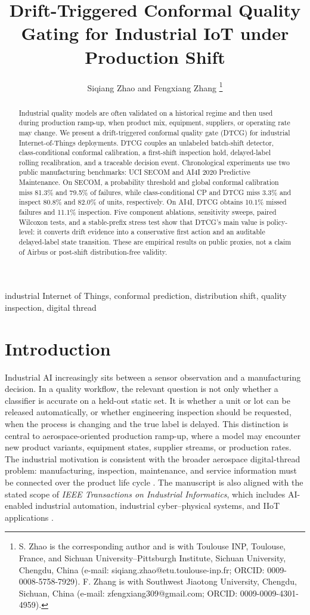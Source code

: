 \documentclass[journal]{IEEEtran}
\title{Drift-Triggered Conformal Quality Gating for Industrial IoT under Production Shift}
\author{Siqiang Zhao and Fengxiang Zhang%
\thanks{S. Zhao is the corresponding author and is with Toulouse INP, Toulouse, France, and Sichuan University--Pittsburgh Institute, Sichuan University, Chengdu, China (e-mail: siqiang.zhao@etu.toulouse-inp.fr; ORCID: 0009-0008-5758-7929). F. Zhang is with Southwest Jiaotong University, Chengdu, Sichuan, China (e-mail: zfengxiang309@gmail.com; ORCID: 0009-0009-4301-4959).}}
\begin{document}
\maketitle

\begin{abstract}
Industrial quality models are often validated on a historical regime and then used during production ramp-up, when product mix, equipment, suppliers, or operating rate may change. We present a drift-triggered conformal quality gate (DTCG) for industrial Internet-of-Things deployments. DTCG couples an unlabeled batch-shift detector, class-conditional conformal calibration, a first-shift inspection hold, delayed-label rolling recalibration, and a traceable decision event. Chronological experiments use two public manufacturing benchmarks: UCI SECOM and AI4I 2020 Predictive Maintenance. On SECOM, a probability threshold and global conformal calibration miss 81.3\% and 79.5\% of failures, while class-conditional CP and DTCG miss 3.3\% and inspect 80.8\% and 82.0\% of units, respectively. On AI4I, DTCG obtains 10.1\% missed failures and 11.1\% inspection. Five component ablations, sensitivity sweeps, paired Wilcoxon tests, and a stable-prefix stress test show that DTCG's main value is policy-level: it converts drift evidence into a conservative first action and an auditable delayed-label state transition. These are empirical results on public proxies, not a claim of Airbus or post-shift distribution-free validity.
\end{abstract}

\begin{IEEEkeywords}
industrial Internet of Things, conformal prediction, distribution shift, quality inspection, digital thread
\end{IEEEkeywords}

\section{Introduction}
\label{sec:intro}

Industrial AI increasingly sits between a sensor observation and a manufacturing decision. In a quality workflow, the relevant question is not only whether a classifier is accurate on a held-out static set. It is whether a unit or lot can be released automatically, or whether engineering inspection should be requested, when the process is changing and the true label is delayed. This distinction is central to aerospace-oriented production ramp-up, where a model may encounter new product variants, equipment states, supplier streams, or production rates. The industrial motivation is consistent with the broader aerospace digital-thread problem: manufacturing, inspection, maintenance, and service information must be connected over the product life cycle \cite{airbus2024report,eskue2023}. The manuscript is also aligned with the stated scope of \emph{IEEE Transactions on Industrial Informatics}, which includes AI-enabled industrial automation, industrial cyber--physical systems, and IIoT applications \cite{tii_scope}.
\end{document}
